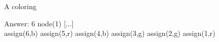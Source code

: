 
\begin{frame}[fragile]{A coloring}
\footnotesize
\begin{semiverbatim}
Answer: 6
node(1)   [...]    \\
\alert{assign(6,b) assign(5,r) assign(4,b) assign(3,g) assign(2,g) assign(1,r)}
\end{semiverbatim}
\pause
\medskip
\begin{center}

\end{center}
\end{frame}


%
